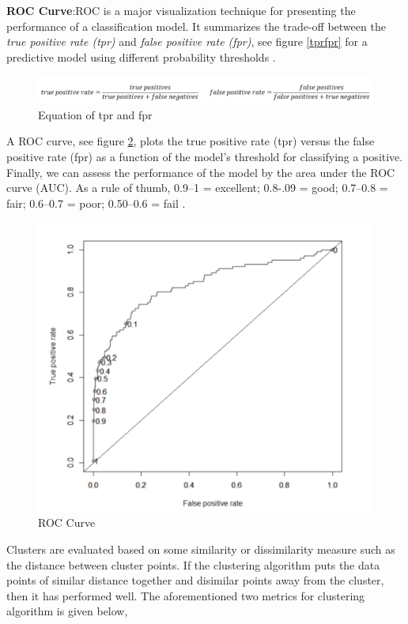 \documentclass[format=sigconf]{acmart}
\begin{document}
\textbf{ROC Curve}:ROC is a major visualization technique for presenting the performance of a classification model. 
It summarizes the trade-off between the \textit{true positive rate (tpr)} and \textit{false positive rate (fpr)}, see figure \ref{tprfpr} 
for a predictive model using different probability thresholds \cite{confusionmatrix}.
\begin{figure}[H]
    \centering
    \includegraphics[scale=0.18]{tpr_fpr_equation.png}
    \caption{Equation of tpr and fpr}
    \label{fig:tprfpr}
\end{figure}
A ROC curve, see figure \ref{fig:roc}, plots the true positive rate (tpr) versus the false positive rate (fpr) as a function of the 
model’s threshold for classifying a positive. Finally, we can assess the performance of the model by the area under the ROC 
curve (AUC). As a rule of thumb, 0.9–1 = excellent; 0.8-.09 = good; 0.7–0.8 = fair; 0.6–0.7 = poor; 0.50–0.6 = fail 
\cite{confusionmatrix}.
\begin{figure}[H]
    \centering
    \includegraphics[scale=0.25]{AUC_ROC_Curve.png}
    \caption{ROC Curve}
    \label{fig:roc}
\end{figure}
Clusters are evaluated based on some similarity or dissimilarity measure such as the distance between cluster points. 
If the clustering algorithm puts the data points of similar distance together and disimilar points away from the cluster, 
then it has performed well. The aforementioned two metrics for clustering algorithm is given below,
\end{document}
